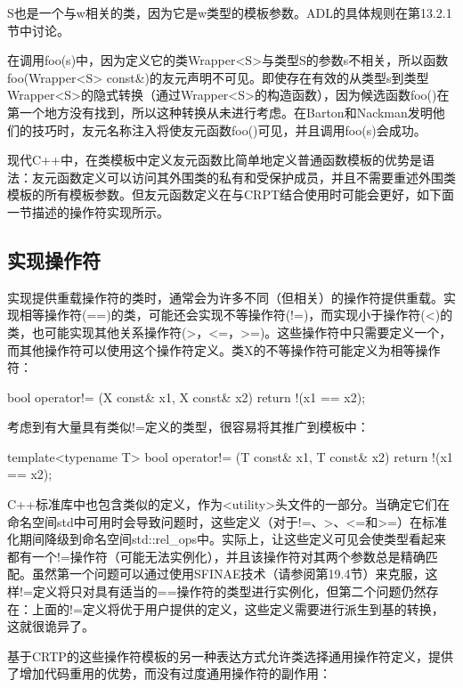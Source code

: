 \begin{notice}
S也是一个与w相关的类，因为它是w类型的模板参数。ADL的具体规则在第13.2.1节中讨论。
\end{notice}

在调用foo(s)中，因为定义它的类Wrapper<S>与类型S的参数s不相关，所以函数foo(Wrapper<S> const\&)的友元声明不可见。即使存在有效的从类型s到类型Wrapper<S>的隐式转换（通过Wrapper<S>的构造函数），因为候选函数foo()在第一个地方没有找到，所以这种转换从未进行考虑。在Barton和Nackman发明他们的技巧时，友元名称注入将使友元函数foo()可见，并且调用foo(s)会成功。

现代C++中，在类模板中定义友元函数比简单地定义普通函数模板的优势是语法：友元函数定义可以访问其外围类的私有和受保护成员，并且不需要重述外围类模板的所有模板参数。但友元函数定义在与CRPT结合使用时可能会更好，如下面一节描述的操作符实现所示。

\subsection{实现操作符}

实现提供重载操作符的类时，通常会为许多不同（但相关）的操作符提供重载。实现相等操作符(==)的类，可能还会实现不等操作符(!=)，而实现小于操作符(<)的类，也可能实现其他关系操作符(>，<=，>=)。这些操作符中只需要定义一个，而其他操作符可以使用这个操作符定义。类X的不等操作符可能定义为相等操作符：

\begin{cpp}
bool operator!= (X const& x1, X const& x2) {
	return !(x1 == x2);
}
\end{cpp}

考虑到有大量具有类似!=定义的类型，很容易将其推广到模板中：

\begin{cpp}
template<typename T>
bool operator!= (T const& x1, T const& x2) {
	return !(x1 == x2);
}
\end{cpp}

C++标准库中也包含类似的定义，作为<utility>头文件的一部分。当确定它们在命名空间std中可用时会导致问题时，这些定义（对于!=、>、<=和>=）在标准化期间降级到命名空间std::rel\_ops中。实际上，让这些定义可见会使类型看起来都有一个!=操作符（可能无法实例化），并且该操作符对其两个参数总是精确匹配。虽然第一个问题可以通过使用SFINAE技术（请参阅第19.4节）来克服，这样!=定义将只对具有适当的==操作符的类型进行实例化，但第二个问题仍然存在：上面的!=定义将优于用户提供的定义，这些定义需要进行派生到基的转换，这就很诡异了。

基于CRTP的这些操作符模板的另一种表达方式允许类选择通用操作符定义，提供了增加代码重用的优势，而没有过度通用操作符的副作用：

